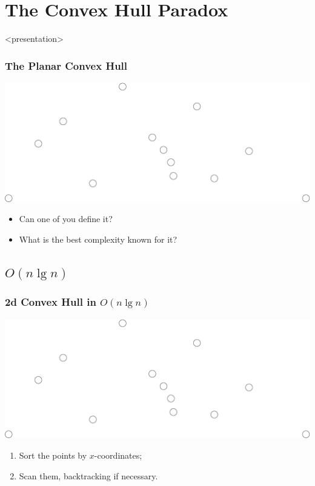 
\section{The Convex Hull Paradox}

\begin{frame}<presentation>
  \frametitle{The Planar Convex Hull}
  \includegraphics[width=\textwidth]{points}
  \begin{itemize}
  \item Can one of you define it?
  \item What is the best complexity known for it?
  \end{itemize}
\end{frame}


\subsection{$O(n\lg n)$}
\begin{frame}
  \frametitle{2d Convex Hull in $O(n\lg n)$}
  \includegraphics[width=\textwidth]{points}
  \begin{enumerate}
  \item Sort the points by $x$-coordinates;
  \item Scan them, backtracking if necessary.
  \end{enumerate}
\end{frame}



